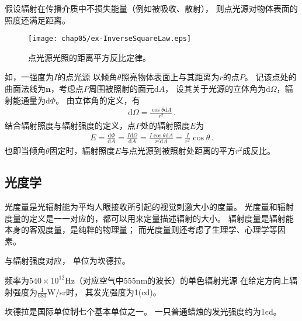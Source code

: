\begin{proposition}
      假设辐射在传播介质中不损失能量（例如被吸收、散射），
      则点光源对物体表面的照度还满足距离。
\end{proposition}
\begin{figure}[htbp]
      \centering
      \texttt{[image: chap05/ex-InverseSquareLaw.eps]}
      \caption{点光源光照的距离平方反比定律。}
      \label{fig:5.exInverseSquareLaw}
\end{figure}
\begin{prove}
      如，一强度为$I$的点光源
      以倾角$\theta$照亮物体表面上与其距离为$r$的点$P$。
      记该点处的曲面法线为$\bm n$，考虑点$P$周围被照射的面元$\mathrm{d}A$，
      设其关于光源的立体角为$\mathrm{d}\varOmega$，辐射能通量为$\mathrm{d}\varPhi$。
      由立体角的定义，有
      \begin{align}
            \mathrm{d}\varOmega=\frac{\cos\theta\mathrm{d}A}{r^2}\, .
      \end{align}
      结合辐射照度与辐射强度的定义，点$P$处的辐射照度$E$为
      \begin{align}
            E=\frac{\mathrm{d}\varPhi}{\mathrm{d}A}=\frac{I\mathrm{d}\varOmega}{\mathrm{d}A}=\frac{I\cos\theta\mathrm{d}A}{r^2\mathrm{d}A}=\frac{I}{r^2}\cos\theta\, .
      \end{align}
      也即当倾角$\theta$固定时，辐射照度$E$与点光源到被照射处距离的平方$r^2$成反比。
\end{prove}

\subsection{光度学}\label{sub:光度学}
光度量是光辐射能为平均人眼接收所引起的视觉刺激大小的度量。
光度量和辐射度量的定义是一一对应的，都可以用来定量描述辐射的大小。
辐射度量是辐射能本身的客观度量，是纯粹的物理量；
而光度量则还考虑了生理学、心理学等因素。

与辐射强度对应，
单位为坎德拉。
\begin{definition}
      频率为$540\times10^{12}\text{Hz}$（对应空气中555nm的波长）的单色辐射光源
      在给定方向上辐射强度为$\displaystyle\frac{1}{683}$W$/$sr时，
      其发光强度为1(cd)。
\end{definition}
坎德拉是国际单位制七个基本单位之一。
一只普通蜡烛的发光强度约为1cd。

